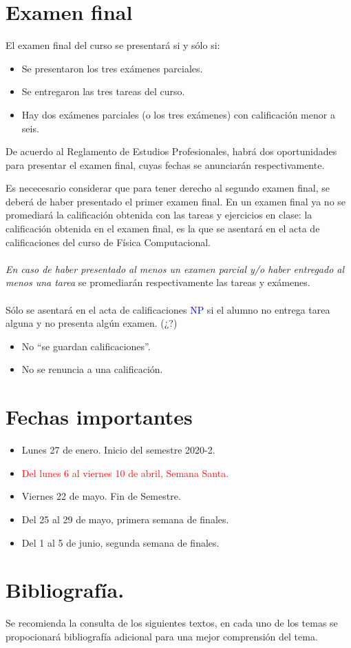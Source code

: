 \documentclass[12pt]{article}
\begin{document}
\section{Examen final}
El examen final del curso se presentará si y sólo si:
\begin{itemize}
\item Se presentaron los tres exámenes parciales.
\item Se entregaron las tres tareas del curso.
\item Hay dos exámenes parciales (o los tres exámenes) con calificación menor a seis.
\end{itemize}
De acuerdo al Reglamento de Estudios Profesionales, habrá dos oportunidades para presentar el examen final, cuyas fechas se anunciarán respectivamente.
\par
Es nececesario considerar que para tener derecho al segundo examen final, se deberá de haber presentado el primer examen final. En un examen final ya no se promediará la calificación obtenida con las tareas y ejercicios en clase: la calificación obtenida en el examen final, es la que se asentará en el acta de calificaciones del curso de Física Computacional.
\\
\\
\emph{En caso de haber presentado al menos un examen parcial y/o haber entregado al menos una tarea} se promediarán respectivamente las tareas y exámenes.
\\
\\
Sólo se asentará en el acta de calificaciones \textcolor{blue}{NP} si el alumno no entrega tarea alguna y no presenta algún examen. (¿?)
\begin{itemize}
\item No \enquote{se guardan calificaciones}.
\item No se renuncia a una calificación.
\end{itemize}
\section{Fechas importantes}
\begin{itemize}
\item Lunes 27 de enero. Inicio del semestre 2020-2.
\item \textcolor{red}{Del lunes 6 al viernes 10 de abril, Semana Santa.}
\item Viernes 22 de mayo. Fin de Semestre.
\item Del 25 al 29 de mayo, primera semana de finales.
\item Del 1 al 5 de junio, segunda semana de finales.
\end{itemize}
\section{Bibliografía.}
Se recomienda la consulta de los siguientes textos, en cada uno de los temas se propocionará bibliografía adicional para una mejor comprensión del tema.
\nocite{*}


\end{document}

